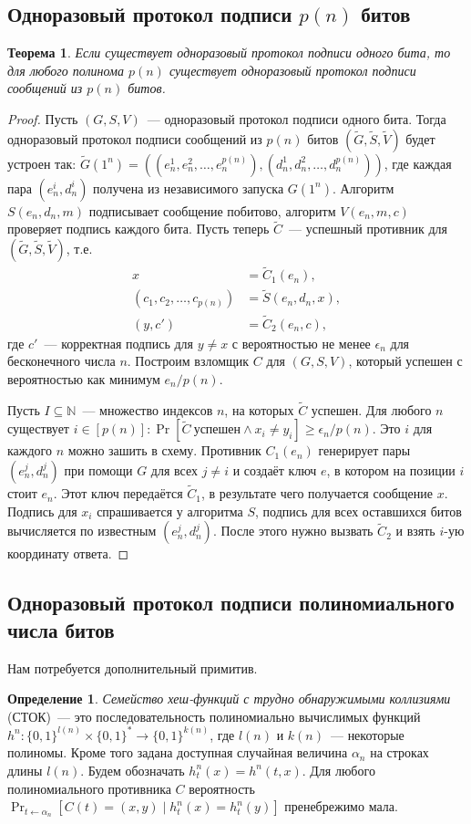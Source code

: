 \documentclass[12pt,a4paper]{article}
\newcommand{\bits}{\{0,1\}}
\newcommand{\seqn}[2]{{#1}_1,{#1}_2,\dotsc,{#1}_{#2}}
\newcommand{\Nat}{\mathbb{N}}
\theoremstyle{definition}
\newtheorem{definition}{Определение}[section]
\theoremstyle{plain}
\newtheorem{theorem}{Теорема}[section]
\theoremstyle{remark}
\begin{document}
\subsection{Одноразовый протокол подписи $p(n)$ битов}
\begin{theorem}
Если существует одноразовый протокол подписи одного бита,
то для любого полинома $p(n)$ существует одноразовый протокол подписи сообщений из $p(n)$ битов.
\end{theorem}
\begin{proof}
Пусть $(G,S,V)$~--- одноразовый протокол подписи одного бита.
Тогда одноразовый протокол подписи сообщений из $p(n)$ битов $(\tilde G, \tilde S, \tilde V)$ будет устроен так:
$\tilde G(1^n) = ((e^1_n, e^2_n, \dotsc, e^{p(n)}_n),(d^1_n, d^2_n, \dotsc, d^{p(n)}_n))$, где каждая пара $(e^i_n,d^i_n)$ получена из независимого запуска $G(1^n)$.
Алгоритм $S(e_n, d_n, m)$ подписывает сообщение побитово,
алгоритм $V(e_n, m, c)$ проверяет подпись каждого бита.
Пусть теперь $\tilde C$~--- успешный противник для $(\tilde G, \tilde S, \tilde V)$, т.е. 
$$
\begin{aligned}
x &= \tilde C_1(e_n),\\
(\seqn{c}{p(n)}) &= \tilde S(e_n, d_n, x),\\
(y, c') &= \tilde C_2(e_n,c),
\end{aligned}
$$
где $c'$~--- корректная подпись для $y\neq x$ с вероятностью 
не менее $\epsilon_n$ для бесконечного числа $n$. Построим взломщик $C$ для $(G,S,V)$, который успешен с вероятностью
как минимум $e_n / p(n)$. 

Пусть $I\subseteq\Nat$~--- множество индексов $n$,
на которых $\tilde C$ успешен. Для любого $n$ существует
$i\in[p(n)]: \Pr[\tilde C\ \text{успешен} \land x_i \neq y_i]\ge
\epsilon_n/p(n).$ Это $i$ для каждого $n$ можно зашить в схему.
Противник $C_1(e_n)$ генерирует пары $(e^j_n,d^j_n)$ 
при помощи $G$ для всех $j\neq i$ и создаёт ключ $e$, в 
котором на позиции $i$ стоит $e_n$. Этот ключ передаётся
$\tilde C_1$, в результате чего получается сообщение $x$.
Подпись для $x_i$ спрашивается у алгоритма $S$, подпись
для всех оставшихся битов вычисляется по известным $(e^j_n,d^j_n)$. После этого нужно вызвать $\tilde C_2$
и взять $i$-ую координату ответа.
\end{proof}

\subsection{Одноразовый протокол подписи полиномиального числа битов}
Нам потребуется дополнительный примитив.
\begin{definition}
\emph{Семейство хеш-функций с трудно обнаружимыми коллизиями}\break
(СТОК)~--- это последовательность полиномиально вычислимых функций $h^n:\bits^{l(n)}\times \bits^{*}\to\bits^{k(n)}$, где $l(n)$ и $k(n)$~--- некоторые полиномы. Кроме того задана
доступная случайная величина $\alpha_n$ на строках длины $l(n)$.
Будем обозначать $h^n_t(x) = h^n(t,x)$.  Для любого 
полиномиального противника $C$ вероятность
$\Pr_{t\gets\alpha_n}[C(t) = (x, y)\mid h^n_t(x) = h^n_t(y)]$
пренебрежимо мала.
\end{definition}
\end{document}
